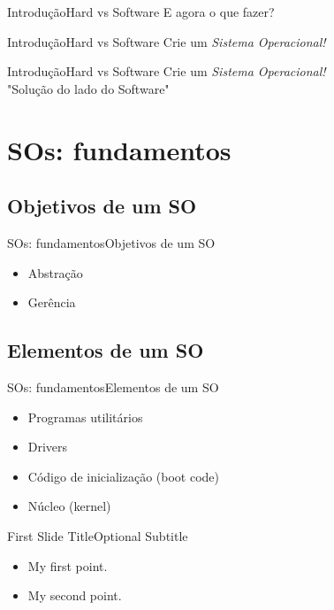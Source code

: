 \documentclass{beamer}
\begin{document}
\begin{frame}{Introdução}{Hard vs Software}
  E agora o que fazer?
\end{frame}

\begin{frame}{Introdução}{Hard vs Software}
  Crie um \emph{Sistema Operacional!}
\end{frame}

\begin{frame}{Introdução}{Hard vs Software}
  Crie um \emph{Sistema Operacional!}\\
  "Solução do lado do Software"
\end{frame}

\section{SOs: fundamentos}
\subsection{Objetivos de um SO}

\begin{frame}{SOs: fundamentos}{Objetivos de um SO}
  \begin{itemize}
  \item Abstração
  \item Gerência
  \end{itemize}
\end{frame}

\subsection{Elementos de um SO}

\begin{frame}{SOs: fundamentos}{Elementos de um SO}
  \begin{itemize}
  \item Programas utilitários
  \item Drivers
  \item Código de inicialização (boot code)
  \item Núcleo (kernel)
  \end{itemize}
\end{frame}

\begin{frame}{First Slide Title}{Optional Subtitle}
  \begin{itemize}
  \item {
    My first point.
  }
  \item {
    My second point.
  }
  \end{itemize}
\end{frame}
\end{document}
